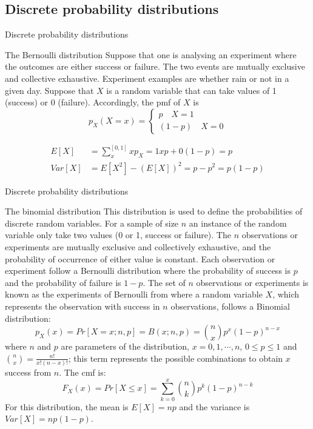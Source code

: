 \documentclass[8pt]{beamer}
\renewcommand{\emph}[1]{\textcolor{myorange}{#1}}
\begin{document}
\subsection{Discrete probability distributions} %
\begin{frame}{Discrete probability distributions}
    \begin{block}{The \alert{Bernoulli} distribution}
        Suppose that one is analysing an experiment where the outcomes are either \emph{success} or \emph{failure}. The two events are \emph{mutually exclusive} and \emph{collective exhaustive}. Experiment examples are whether rain or not in a given day. Suppose that $X$ is a random variable that can take values of 1 (\emph{success}) or 0 (\emph{failure}). Accordingly, the \emph{pmf} of $X$ is
\[
p_X (X = x) = 
\left\{
\begin{array}{l}
    p \quad X=1  \\
    (1-p) \quad X=0 
\end{array}
\right.
\]

\begin{align*}
    E[X] &= \sum_x^{[0,1]} x p_X = 1xp + 0(1-p) = p \\
    Var[X] &= E[X^2]- (E[X])^2 = p-p^2 = p(1-p)
\end{align*}

    \end{block}
\end{frame}

\begin{frame}{Discrete probability distributions}

    \begin{block}{The \alert{binomial} distribution}
        This distribution is used to define the probabilities of discrete random variables. For a sample of size $n$ an instance of the random variable only take two values (0 or 1, success or failure). The $n$ observations or experiments are mutually exclusive and collectively exhaustive, and the probability of occurrence of either value is constant. Each observation or experiment follow a \alert{Bernoulli distribution} where the probability of success is $p$ and the probability of failure is $1-p$. The set of $n$ observations or experiments is known as the experiments of Bernoulli from where a random variable $X$, which represents the observation with success in $n$ observations, follows a \alert{Binomial distribution}:
        \[
            p_X (x) = Pr[X = x; n,p] = B(x;n,p) = \binom{n}{x} p^x (1-p)^{n-x}
        \]
        where $n$ and $p$ are parameters of the distribution, $x=0,1,\cdots, n$, $0 \leq p \leq 1$ and $\binom{n}{x}=\frac{n!}{x! (n-x)!}$; this term represents the possible combinations to obtain $x$ success from $n$. The \emph{cmf} is:
        \[
            F_X (x) = Pr[X\leq x] = \sum_{k=0}^x \binom{n}{k} p^k (1-p)^{n-k}
        \]
        For this distribution, the mean is $E[X] = np$ and the variance is $Var[X] = np(1-p)$.
    \end{block}
    \end{frame}
\end{document}
